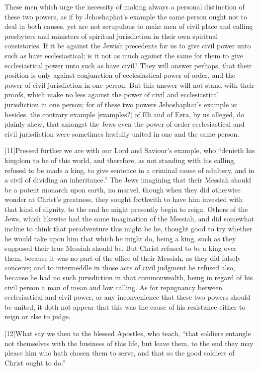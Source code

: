 These men which urge the necessity of making always a personal distinction of these two powers, as if by Jehoshaphat’s example the same person ought not to deal in both causes, yet are not scrupulous to make men of civil place and calling presbyters and ministers of spiritual jurisdiction in their own spiritual consistories. If it be against the Jewish precedents for us to give civil power unto such as have ecclesiastical; is it not as much against the same for them to give ecclesiastical power unto such as have civil? They will answer perhaps, that their position is only against conjunction of ecclesiastical power of order, and the power of civil jurisdiction in one person. But this answer will not stand with their proofs, which make no less against the power of civil and ecclesiastical jurisdiction in one person; for of these two powers Jehoshaphat’s example is: besides, the contrary example [examples?] of Eli and of Ezra, by us alleged, do plainly shew, that amongst the Jews even the power of order ecclesiastical and civil jurisdiction were sometimes lawfully united in one and the same person.


[11]Pressed further we are with our Lord and Saviour’s example, who “denieth his kingdom to be of this world, and therefore, as not standing with his calling, refused to be made a king, to give sentence in a criminal cause of adultery, and in a civil of dividing an inheritance.” The Jews imagining that their Messiah should be a potent monarch upon earth, no marvel, though when they did otherwise wonder at Christ’s greatness, they sought forthwith to have him invested with that kind of dignity, to the end he might presently begin to reign. Others of the Jews, which likewise had the same imagination of the Messiah, and did somewhat incline to think that peradventure this might be he, thought good to try whether he would take upon him that which he might do, being a king, such as they supposed their true Messiah should be. But Christ refused to be a king over them, because it was no part of the office of their Messiah, as they did falsely conceive; and to intermeddle in those acts of civil judgment he refused also, because he had no such jurisdiction in that commonwealth, being in regard of his civil person a man of mean and low calling. As for repugnancy between ecclesiastical and civil power, or any inconvenience that these two powers should be united, it doth not appear that this was the cause of his resistance either to reign or else to judge.

[12]What say we then to the blessed Apostles, who teach,  “that soldiers entangle not themselves with the business of this life, but leave them, to the end they may please him who hath chosen them to serve, and that so the good soldiers of Christ ought to do.”

